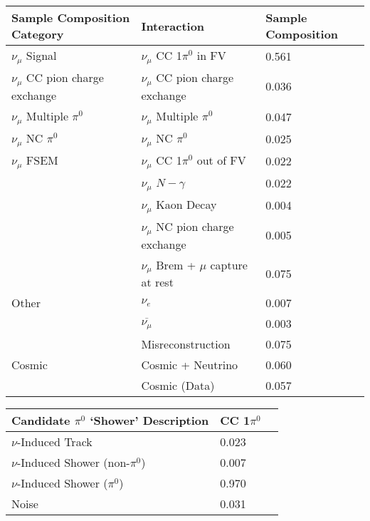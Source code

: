 \begin{table}[H]
\centering
{}
 \begin{tabular}{|l|l|l|}
 \hline
Sample Composition Category & Interaction & Sample Composition \\ [0.1ex] \hline
$\nu_\mu$ Signal & $\nu_\mu$ CC 1$\pi^0$ in FV & 0.561 \\ \hline
$\nu_\mu$ CC pion charge exchange & $\nu_\mu$ CC pion charge exchange & 0.036 \\ \hline
$\nu_\mu$ Multiple $\pi^0$ & $\nu_\mu$ Multiple $\pi^0$ & 0.047 \\ \hline
$\nu_\mu$ NC $\pi^0$ & $\nu_\mu$ NC $\pi^0$ & 0.025 \\ \hline
$\nu_\mu$ FSEM & $\nu_\mu$ CC 1$\pi^0$ out of FV & 0.022 \\
& $\nu_\mu$ $N-\gamma$ & 0.022 \\
& $\nu_\mu$ Kaon Decay & 0.004 \\
& $\nu_\mu$ NC pion charge exchange & 0.005 \\ 
&$\nu_\mu$ Brem + $\mu$ capture at rest & 0.075 \\ \hline
Other & $\nu_e$ &0.007 \\
&$\overline{\nu_\mu}$ & 0.003 \\
& Misreconstruction & 0.075 \\ \hline
Cosmic & Cosmic + Neutrino & 0.060 \\
& Cosmic (Data) & 0.057 \\ \hline
\end{tabular}
\end{table}

\begin{table}[H]
\centering
{}
 \begin{tabular}{|l|l|l|}
 \hline
Candidate $\pi^0$ `Shower' Description & CC 1$\pi^0$ \\ [0.1ex] \hline
$\nu$-Induced Track & 0.023 \\ 
$\nu$-Induced Shower (non-$\pi^0$) & 0.007 \\ 
$\nu$-Induced Shower ($\pi^0$) & 0.970 \\ 
Noise & 0.031  \\ \hline
\end{tabular}
\end{table}

